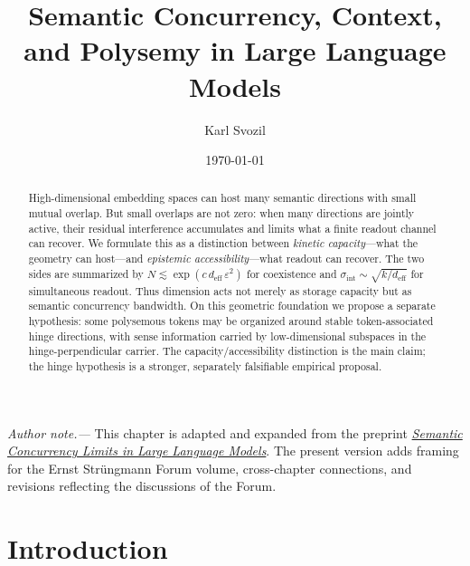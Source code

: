 \documentclass[
  aps,
  reprint,
  superscriptaddress,
  floatfix,
  nofootinbib,
  longbibliography
]{revtex4-2}
\newcommand{\deff}{d_{\mathrm{eff}}}
\newcommand{\sint}{\sigma_{\mathrm{int}}}
\begin{document}
\title{Semantic Concurrency, Context, and Polysemy in Large Language Models}

\author{Karl Svozil}

\date{\today}

\begin{abstract}
High-dimensional embedding spaces can host many semantic directions
with small mutual overlap. But small overlaps are not zero: when many
directions are jointly active, their residual interference accumulates
and limits what a finite readout channel can recover. We formulate this
as a distinction between \emph{kinetic capacity}---what the geometry
can host---and \emph{epistemic accessibility}---what readout can
recover. The two sides are summarized by
$N\lesssim\exp(c\,\deff\,\varepsilon^{2})$ for coexistence and
$\sint\sim\sqrt{k/\deff}$ for simultaneous readout. Thus dimension acts
not merely as storage capacity but as semantic concurrency bandwidth.
On this geometric foundation we propose a separate hypothesis: some
polysemous tokens may be organized around stable token-associated
hinge directions, with sense information carried by low-dimensional
subspaces in the hinge-perpendicular carrier. The capacity/accessibility
distinction is the main claim; the hinge hypothesis is a stronger,
separately falsifiable empirical proposal.
\end{abstract}

\maketitle

\noindent\textit{Author note.---}
This chapter is adapted and expanded from the preprint
\href{https://doi.org/10.48550/arXiv.2504.13824}{\textit{Semantic
Concurrency Limits in Large Language Models}}.  The present version adds
framing for the Ernst Str\"ungmann Forum volume, cross-chapter connections,
and revisions reflecting the discussions of the Forum.

\section{Introduction}
\label{sec:intro}
\end{document}
